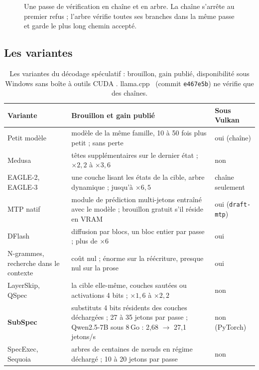 \begin{figure}[ht]
\centering
\SchemaSpeculation
\caption[Vérification en chaîne et en arbre]{Une passe de vérification en chaîne et en arbre. La chaîne s'arrête au premier refus ; l'arbre vérifie toutes ses branches dans la même passe et garde le plus long chemin accepté.}
\label{fig:speculation}
\end{figure}

\subsection{Les variantes}

\begin{table}[ht]
\centering\small
\caption[Les variantes du décodage spéculatif]{Les variantes du décodage spéculatif : brouillon, gain publié, disponibilité sous Windows sans boîte à outils CUDA \litt. llama.cpp~\cite{llamacpp} (commit \texttt{e467e5b}) ne vérifie que des chaînes.}
\label{tab:variantes-spec}
\begin{tabularx}{\linewidth}{@{}lXl@{}}
\toprule
Variante & Brouillon et gain publié & Sous Vulkan \\
\midrule
Petit modèle~\cite{leviathan2023,chen2023spec} & modèle de la même famille, 10 à 50 fois plus petit ; sans perte & oui (chaîne) \\
Medusa~\cite{medusa2024} & têtes supplémentaires sur le dernier état ; $\times2{,}2$ à $\times3{,}6$ & non \\
EAGLE-2, EAGLE-3~\cite{eagle2_2024,eagle3_2025} & une couche lisant les états de la cible, arbre dynamique ; jusqu'à $\times6{,}5$ & chaîne seulement \\
MTP natif~\cite{gloeckle2024,deepseekv3_2024} & module de prédiction multi-jetons entraîné avec le modèle ; brouillon gratuit s'il réside en VRAM & oui (\texttt{draft-mtp}) \\
DFlash~\cite{dflash2026} & diffusion par blocs, un bloc entier par passe ; plus de $\times6$ & oui \\
N-grammes, recherche dans le contexte~\cite{lookahead2024} & coût nul ; énorme sur la réécriture, presque nul sur la prose & oui \\
LayerSkip, QSpec~\cite{layerskip2024,qspec2024} & la cible elle-même, couches sautées ou activations 4 bits ; $\times1{,}6$ à $\times2{,}2$ & non \\
\textbf{SubSpec}~\cite{subspec2025} & substituts 4 bits résidents des couches déchargées ; 27 à 35 jetons par passe ; Qwen2.5-7B sous 8\,Go : 2,68 $\to$ 27,1 jetons/s & non (PyTorch) \\
SpecExec, Sequoia~\cite{specexec2024,sequoia2024} & arbres de centaines de nœuds en régime déchargé ; 10 à 20 jetons par passe & non \\
\bottomrule
\end{tabularx}
\end{table}

